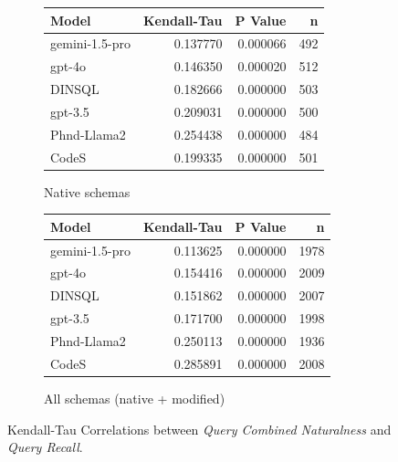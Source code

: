 \begin{figure}
  \centering
  \begin{subfigure}{.5\linewidth}
      \centering
      \begin{tabular}{lrrr}
\toprule
Model & Kendall-Tau & P Value & n \\
\midrule
gemini-1.5-pro & 0.137770 & 0.000066 & 492 \\
gpt-4o & 0.146350 & 0.000020 & 512 \\
DINSQL & 0.182666 & 0.000000 & 503 \\
gpt-3.5 & 0.209031 & 0.000000 & 500 \\
Phnd-Llama2 & 0.254438 & 0.000000 & 484 \\
CodeS & 0.199335 & 0.000000 & 501 \\
\bottomrule
\end{tabular}

      \caption{Native schemas}
      \label{table:recallktaunative}
  \end{subfigure}%
  \begin{subfigure}{.5\linewidth}
      \centering
      \begin{tabular}{lrrr}
\toprule
Model & Kendall-Tau & P Value & n \\
\midrule
gemini-1.5-pro & 0.113625 & 0.000000 & 1978 \\
gpt-4o & 0.154416 & 0.000000 & 2009 \\
DINSQL & 0.151862 & 0.000000 & 2007 \\
gpt-3.5 & 0.171700 & 0.000000 & 1998 \\
Phnd-Llama2 & 0.250113 & 0.000000 & 1936 \\
CodeS & 0.285891 & 0.000000 & 2008 \\
\bottomrule
\end{tabular}

      \caption{All schemas (native + modified)}
      \label{table:recallktauall}
  \end{subfigure}
  \caption{Kendall-Tau Correlations between \emph{Query Combined Naturalness} and \emph{Query Recall}.}
\end{figure}

